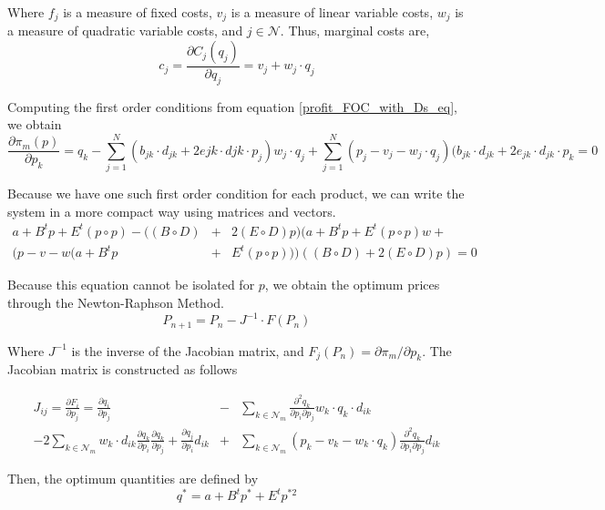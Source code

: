 \documentclass[12pt]{article}
\begin{document}
Where $f_j$ is a measure of fixed costs, $v_j$ is a measure of linear variable costs, $w_j$ is a measure of quadratic variable costs, and $j \in \mathcal{N}$. Thus, marginal costs are,
\begin{equation*}
c_j = \frac{\partial C_j(q_j)}{\partial q_j}= v_j + w_j \cdot q_j
\end{equation*}

Computing the first order conditions from equation \ref{profit_FOC_with_Ds_eq}, we obtain
\begin{equation*}
\frac{\partial \pi_m(p)}{\partial p_k} = q_k - \sum_{j = 1}^N (b_{jk} \cdot d_{jk} + 2e{jk} \cdot d{jk} \cdot p_j) w_j \cdot q_j + \sum_{j = 1}^N (p_j - v_j - w_j \cdot q_j)(b_{jk} \cdot d_{jk} + 2e_{jk} \cdot d_{jk} \cdot p_k = 0
\end{equation*}

Because we have one such first order condition for each product, we can write the system in a more compact way using matrices and vectors. 
\begin{eqnarray*}
a + B^t p + E^t (p \circ p) - ((B \circ D) &+& 2(E \circ D)p) (a + B^t p + E^t (p \circ p) w + \\
(p - v - w(a + B^t p &+& E^t (p \circ p)))((B \circ D) + 2 (E \circ D) p) = 0
\end{eqnarray*}

Because this equation cannot be isolated for $p$, we obtain the optimum prices through the Newton-Raphson Method.
\begin{equation*}
P_{n+1} = P_n - J^{-1} \cdot F(P_n)
\end{equation*}

Where $J^{-1}$ is the inverse of the Jacobian matrix, and $F_j(P_n) = \partial \pi_m / \partial p_k$. The Jacobian matrix is constructed as follows

\begin{eqnarray*}
J_{ij} = \frac{\partial F_i}{\partial p_j} = \frac{\partial q_i}{\partial p_j} &-& \sum_{k \in \mathcal{N}_m} \frac{\partial^2 q_k}{\partial p_i \partial p_j} w_k \cdot q_k \cdot d_{ik}\\
 - 2\sum_{k \in \mathcal{N}_m} w_k \cdot d_{ik} \frac{\partial q_k}{\partial p_i} \frac{\partial q_k}{\partial p_j} + \frac{\partial q_j}{\partial p_i} d_{ik} &+& \sum_{k \in \mathcal{N}_m} (p_k - v_k - w_k \cdot q_k) \frac{\partial^2 q_k}{\partial p_i \partial p_j}d_{ik}
\end{eqnarray*}

Then, the optimum quantities are defined by 
\begin{equation*}
q^* = a + B^t p^* + E^t p^{*2}
\end{equation*}
\end{document}
